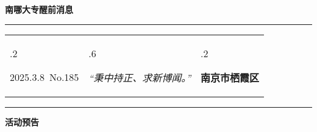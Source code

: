 \documentclass[letterpaper, 12pt]{article}
\begin{document}
\begin{center}
    \Huge\textbf{南哪大专醒前消息}
\end{center}
\vspace{4mm}
\hrule
\renewcommand\tabularxcolumn[1]{m{#1}}
\begin{tabularx}{\textwidth}{>{\hsize.2\hsize}X>{\hsize.6\hsize}X>{\hsize.2\hsize}X}
    \begin{flushleft}
        2025.3.8\, No.185
    \end{flushleft}
    &
    \begin{center}
        \textit{“秉中持正、求新博闻。”}
    \end{center}
    &
    \begin{flushright}
        \textbf{南京市栖霞区}
    \end{flushright}
\end{tabularx}
\vspace{-3.5mm}
\hrule
\vspace{4mm}
\centerline{\huge\textbf{活动预告}}
\end{document}
